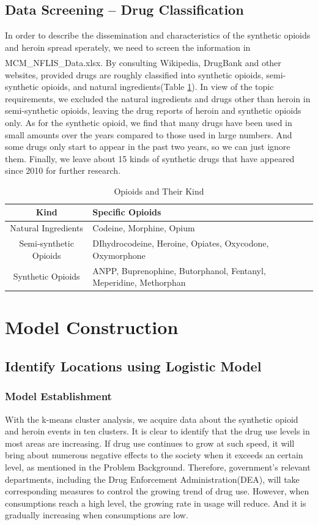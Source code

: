 \documentclass[12pt]{article}
\newcommand{\upcite}[1]{\textsuperscript{\textsuperscript{\cite{#1}}}}
\begin{document}
\subsection{Data Screening -- Drug Classification}
In order to describe the dissemination and characteristics of the synthetic opioids and heroin spread sperately, we need to screen the information in MCM\_NFLIS\_Data.xlsx. By consulting Wikipedia, DrugBank\upcite{4} and other websites, provided drugs are roughly classified into synthetic opioids, semi-synthetic opioids, and natural ingredients(Table \ref{opioid kind}). In view of the topic requirements, we excluded the natural ingredients and drugs other than heroin in semi-synthetic opioids, leaving the drug reports of heroin and synthetic opioids only. As for the synthetic opioid, we find that many drugs have been used in small amounts over the years compared to those used in large numbers. And some drugs only start to appear in the past two years, so we can just ignore them. Finally, we leave about 15 kinds of synthetic drugs that have appeared since 2010 for further research.
\begin{table}[H]
	\small
	\centering
	\caption{Opioids and Their Kind}
	\begin{tabular}{c|l}
	\hline
	Kind & Specific Opioids\\
	\hline
	Natural Ingredients	& Codeine, Morphine, Opium \\
	\hline
	Semi-synthetic Opioids & DIhydrocodeine, Heroine, Opiates, Oxycodone, Oxymorphone\\
	\hline
	Synthetic Opioids &  ANPP, Buprenophine, Butorphanol, Fentanyl, Meperidine, Methorphan\\
	\hline
	\end{tabular}
	\label{opioid kind}
\end{table}

\section{Model Construction}
\subsection{Identify Locations using Logistic Model}
\subsubsection{Model Establishment}
With the k-means cluster analysis, we acquire data about the synthetic opioid and heroin events in ten clusters. It is clear to identify that the drug use levels in most areas are increasing. If drug use continues to grow at such speed, it will bring about numerous negative effects to the society when it exceeds an certain level, as mentioned in the Problem Background. Therefore, government’s relevant departments, including the Drug Enforcement Administration(DEA), will take corresponding measures to control the growing trend of drug use. However, when consumptions reach a high level, the growing rate in usage will reduce. And it is gradually increasing when consumptions are low.
\end{document}
